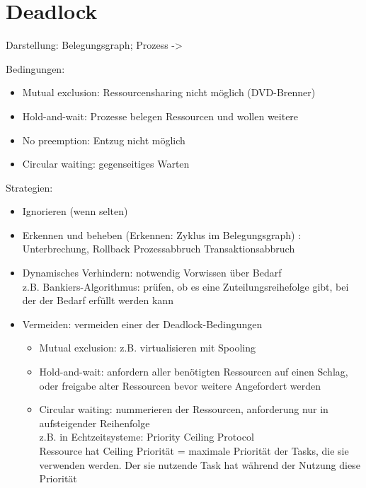 \section*{Deadlock}
Darstellung: Belegungsgraph; Prozess -> 


\begin{tikzpicture}

\end{tikzpicture}

Bedingungen: 
\begin{itemize}
\item Mutual exclusion: Ressourcensharing nicht möglich (DVD-Brenner)
\item Hold-and-wait: Prozesse belegen Ressourcen und wollen weitere
\item No preemption: Entzug nicht möglich
\item Circular waiting: gegenseitiges Warten
\end{itemize}

Strategien: 
\begin{itemize}
\item Ignorieren (wenn selten)
\item Erkennen und beheben (Erkennen: Zyklus im Belegungsgraph) :\\
Unterbrechung, Rollback Prozessabbruch Transaktionsabbruch
\item Dynamisches Verhindern: notwendig Vorwissen über Bedarf \\
z.B. Bankiers-Algorithmus: prüfen, ob es eine Zuteilungsreihefolge gibt, bei der der Bedarf erfüllt werden kann

\item Vermeiden: vermeiden einer der Deadlock-Bedingungen
\begin{itemize}
\item Mutual exclusion: z.B. virtualisieren mit Spooling
\item Hold-and-wait: anfordern aller benötigten Ressourcen auf einen Schlag, oder freigabe alter Ressourcen bevor weitere Angefordert werden
\item Circular waiting: nummerieren der Ressourcen, anforderung nur in aufsteigender Reihenfolge\\
z.B. in Echtzeitsysteme: Priority Ceiling Protocol\\
Ressource hat Ceiling Priorität = maximale Priorität der Tasks, die sie verwenden werden. Der sie nutzende Task hat während der Nutzung diese Priorität
\end{itemize}
\end{itemize}
